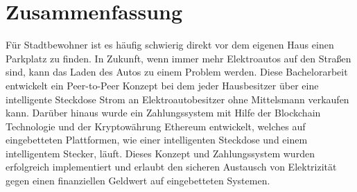 \thispagestyle{empty}

\section*{Zusammenfassung}

Für Stadtbewohner ist es häufig schwierig direkt vor dem eigenen Haus einen Parkplatz zu finden.
In Zukunft, wenn immer mehr Elektroautos auf den Straßen sind, kann das Laden des Autos zu einem Problem werden.
Diese Bachelorarbeit entwickelt ein Peer-to-Peer Konzept bei dem jeder Hausbesitzer über eine intelligente Steckdose Strom an Elektroautobesitzer ohne Mittelsmann verkaufen kann.
Darüber hinaus wurde ein Zahlungssystem mit Hilfe der Blockchain Technologie und der Kryptowährung Ethereum entwickelt, welches auf eingebetteten Plattformen, wie einer intelligenten Steckdose und einem intelligentem Stecker, läuft.
Dieses Konzept und Zahlungssystem wurden erfolgreich implementiert und erlaubt den sicheren Austausch von Elektrizität gegen einen finanziellen Geldwert auf eingebetteten Systemen.